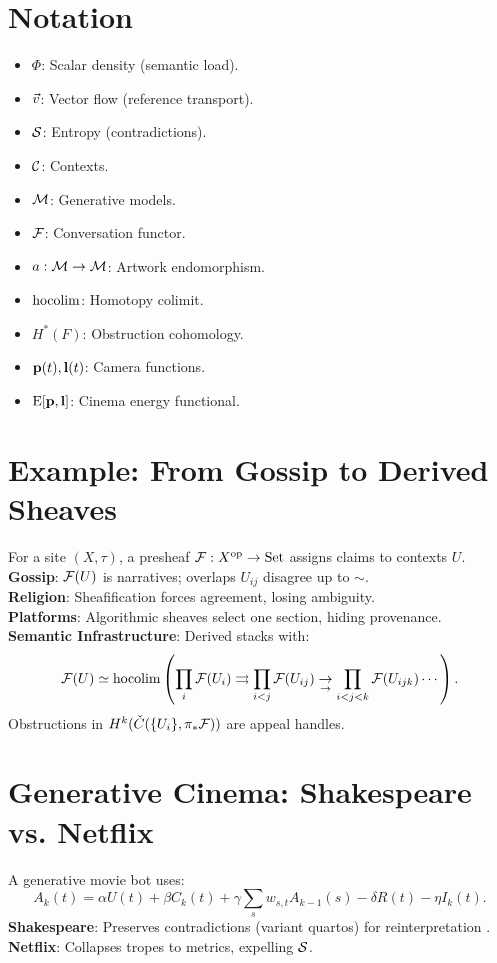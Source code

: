 \section{Notation}
\begin{itemize}
    \item $\Phi$: Scalar density (semantic load).
    \item $\vec{v}$: Vector flow (reference transport).
    \item $\mathcal{S}$: Entropy (contradictions).
    \item $\mathcal{C}$: Contexts.
    \item $\mathcal{M}$: Generative models.
    \item $\mathcal{F}$: Conversation functor.
    \item $a: \mathcal{M} \to \mathcal{M}$: Artwork endomorphism.
    \item $\operatorname{hocolim}$: Homotopy colimit.
    \item $H^*(F)$: Obstruction cohomology.
    \item $\mathbf{p}(t), \mathbf{l}(t)$: Camera functions.
    \item $\mathrm{E}[\mathbf{p}, \mathbf{l}]$: Cinema energy functional.
\end{itemize}

\section{Example: From Gossip to Derived Sheaves}
For a site $(X, \tau)$, a presheaf $\mathcal{F}: X^{\text{op}} \to \mathrm{Set}$ assigns claims to contexts $U$. \\
\textbf{Gossip}: $\mathcal{F}(U)$ is narratives; overlaps $U_{ij}$ disagree up to $\sim$. \\
\textbf{Religion}: Sheafification forces agreement, losing ambiguity. \\
\textbf{Platforms}: Algorithmic sheaves select one section, hiding provenance. \\
\textbf{Semantic Infrastructure}: Derived stacks with:
\[
\mathcal{F}(U) \simeq \operatorname{hocolim} \left( \prod_i \mathcal{F}(U_i) \rightrightarrows \prod_{i < j} \mathcal{F}(U_{ij}) \underset{\to}{\to} \prod_{i < j < k} \mathcal{F}(U_{ijk}) \cdots \right).
\]
Obstructions in $H^k(\check{C}(\{U_i\}, \pi_* \mathcal{F}))$ are appeal handles.

\section{Generative Cinema: Shakespeare vs. Netflix}
A generative movie bot uses:
\[
A_k(t) = \alpha U(t) + \beta C_k(t) + \gamma \sum_s w_{s,t} A_{k-1}(s) - \delta R(t) - \eta I_k(t).
\]
\textbf{Shakespeare}: Preserves contradictions (variant quartos) for reinterpretation \citep{shakespeare1623folio}. \\
\textbf{Netflix}: Collapses tropes to metrics, expelling $\mathcal{S}$.
